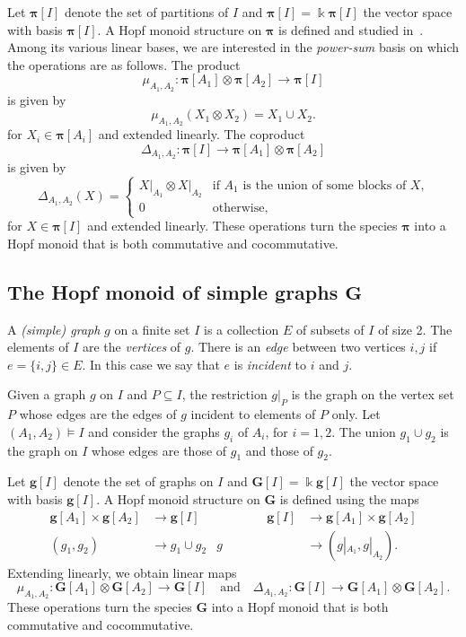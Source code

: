 \documentclass[10pt]{amsart}
\theoremstyle{definition}
\def\field{\Bbbk}
\newcommand{\rG}{\mathbf{g}}
\newcommand{\bPi}{\bpi}
\newcommand{\bG}{\mathbf{G}}
\newcommand{\bpi}{\boldsymbol \pi}
\newcommand{\qand}{\quad\text{and}\quad}
\begin{document}
Let ${\bpi}[I]$ denote the set of partitions of $I$ and $\bPi[I]=\field {\bpi}[I]$ the vector
space with basis ${\bpi}[I]$. 
A Hopf monoid structure on $\bPi$ is defined and studied in~\cite{AguiarBergeronThiem,AM:2010,BakerJarvisBergeronThiem,BergeronZabrocki}. Among its various linear bases, we are interested in the \emph{power-sum} basis 
on which the operations are as follows. 
The product
\[
\mu_{A_1,A_2}: \bPi[A_1] \otimes \bPi[A_2] \to \bPi[I] 
\]
is given by
\begin{equation}\label{e:prod-m}
\mu_{A_1,A_2}({X_1} \otimes {X_2}) = X_1\cup X_2.
\end{equation}
for $X_i\in {\bpi}[A_i]$ and extended linearly. The coproduct
\[
\Delta_{A_1,A_2}: \bPi[I] \to \bPi[A_1]\otimes\bPi[A_2]
\]
is given by
\begin{equation}\label{e:coprod-m}
\Delta_{A_1,A_2}(X) = 
\begin{cases}
{X|_{A_1}} \otimes {X|_{A_2}} & \text{if $A_1$ is the union of some blocks of $X$,} \\
0 & \text{otherwise,}
\end{cases}
\end{equation}
for $X\in {\bpi}[I]$ and extended linearly.
These operations turn the species $\bPi$ into a Hopf monoid that is both commutative and cocommutative.

\subsection{The Hopf monoid of simple graphs \texorpdfstring{$\mathbf{G}$}{G}}\label{ss:graph}

A \emph{(simple) graph} $g$ on a finite set $I$ is a collection $E$ of subsets of $I$ of size 2.
The elements of $I$ are the \emph{vertices} of $g$.
There is an \emph{edge} between two vertices $i, j$ if $e=\{i,j\}\in E$. In this case we say that $e$ is \emph{incident} to $i$ and $j$.


 Given a graph $g$ on $I$ and $P\subseteq I$, the restriction
$g|_P$ is the graph on the vertex set $P$ whose edges are the edges of $g$ incident to elements of $P$ only.
Let $(A_1, A_2)\models I$ and
consider the graphs $g_i$ of $A_i$, for $i=1,2$.
The union $g_1\cup g_2$ is the graph on $I$ 
whose edges are those of $g_1$ and those of $g_2$.

Let $\rG[I]$ denote the set of graphs on $I$ and $\bG[I]=\field \rG[I]$ the vector
space with basis $\rG[I]$. 
A Hopf monoid structure on $\bG$ is defined using the maps
\begin{equation}\label{e:G}
\begin{aligned}
\rG[A_1]\times\rG[A_2] & \to \rG[I] &\qquad\qquad \rG[I] & \to \rG[A_1]\times\rG[A_2]\\
(g_1,g_2) & \to g_1\cup g_2
& g & \to (g |_{A_1},g |_{A_2}).
\end{aligned}
\end{equation}
Extending linearly, we obtain linear maps
\[
 \mu_{A_1,A_2}:\bG[A_1]\otimes\bG[A_2] \to \bG[I]
 \qand
\Delta_{A_1,A_2}:\bG[I]\to \bG[A_1]\otimes\bG[A_2].
\]
These operations turn the species $\bG$ into a Hopf monoid that is both commutative and cocommutative.
\end{document}
